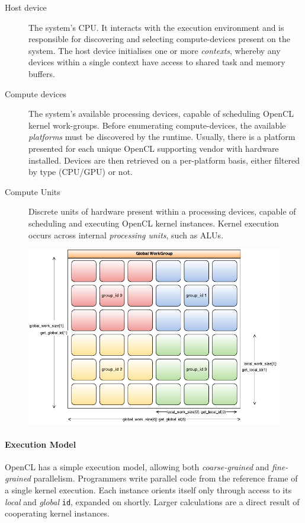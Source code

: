 \begin{description}
\item[Host device] The system's \ac{CPU}. It interacts with the execution environment and is responsible for discovering and selecting compute-devices present on the system. The host device initialises one or more \emph{contexts}, whereby any devices within a single context have access to shared task and memory buffers.

\item[Compute devices] The system's available processing devices, capable of scheduling \ac{OpenCL} kernel work-groups. Before enumerating compute-devices, the available \emph{platforms} must be discovered by the runtime. Usually, there is a platform presented for each unique \ac{OpenCL} supporting vendor with hardware installed. Devices are then retrieved on a per-platform basis, either filtered by type (\ac{CPU}/\ac{GPU}) or not.

\item[Compute Units] Discrete units of hardware present within a processing devices, capable of scheduling and executing \ac{OpenCL} kernel instances.
Kernel execution occurs across internal \emph{processing units}, such as \acp{ALU}.
\end{description}

\begin{figure}[h]
	\includegraphics[width=\textwidth]{./figures/workgroups}
	\label{fig:ocl_ex_model}
\end{figure}

\paragraph*{Execution Model}
\ac{OpenCL} has a simple execution model, allowing both \emph{coarse-grained} and \emph{fine-grained} parallelism. Programmers write parallel code from the reference frame of a single kernel execution. Each instance orients itself only through access to its \emph{local} and \emph{global} \verb|id|, expanded on shortly. Larger calculations are a direct result of cooperating kernel instances. 

